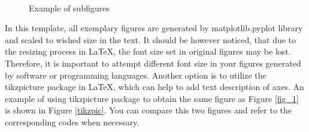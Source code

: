 	\begin{figure}[h!]
		\centering
		 \hspace{1cm}
		 \\
		\caption{Example of subfigures}\label{subfloats}
	\end{figure}

	In this template, all exemplary figures are generated by matplotlib.pyplot library and scaled to wished size in the text. It should be however noticed, that due to the resizing process in \LaTeX, the font size set in original figures may be lost. Therefore, it is important to attempt different font size in your figures generated by software or programming languages. Another option is to utilize the {\color{blue}tikzpicture} package in \LaTeX, which can help to add text description of axes. An example of using {\color{blue}tikzpicture} package to obtain the same figure as Figure \ref{fig_1} is shown in Figure \ref{tikzpic}. You can compare this two figures and refer to the corresponding codes when necessary.
	
